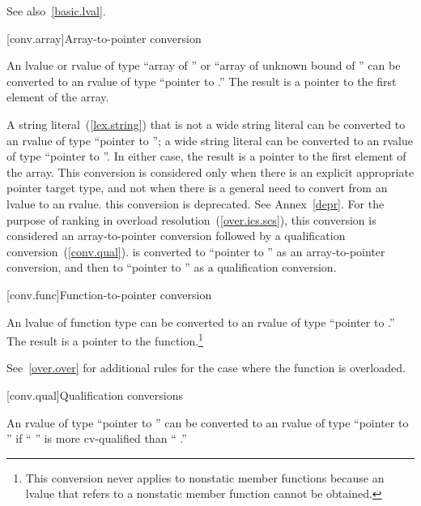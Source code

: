 \pnum
\enternote 
See also~\ref{basic.lval}.\exitnote 

[conv.array]{Array-to-pointer conversion}

\pnum
{}%
%
An lvalue or rvalue of type ``array of  '' or ``array
of unknown bound of '' can be converted to an rvalue of type
``pointer to .'' The result is a pointer to the first element
of the array.

\pnum
A string literal~(\ref{lex.string}) that is not a wide string literal
can be converted to an rvalue of type ``pointer to '';
a wide string literal can be converted to an rvalue of type ``pointer to
''. In either case, the result is a pointer to the first
element of the array. This conversion is considered only when there is
an explicit appropriate pointer target type, and not when there is a
general need to convert from an lvalue to an rvalue. \enternote this
conversion is deprecated. See Annex~\ref{depr}. \exitnote For the
purpose of ranking in overload resolution~(\ref{over.ics.scs}), this
conversion is considered an array-to-pointer conversion followed by
a qualification conversion~(\ref{conv.qual}). \enterexample {}
is converted to ``pointer to  '' as an
array-to-pointer conversion, and then to ``pointer to ''
as a qualification conversion. \exitexample

[conv.func]{Function-to-pointer conversion}

\pnum
{}%
An lvalue of function type  can be converted to an rvalue of
type ``pointer to .'' The result is a pointer to the
function.\footnote{This conversion never applies to nonstatic member functions because an
lvalue that refers to a nonstatic member function cannot be obtained.}

\pnum
\enternote 
See~\ref{over.over} for additional rules for the case where the function
is overloaded.
\exitnote 

[conv.qual]{Qualification conversions}

\pnum
{}%
An rvalue of type ``pointer to  '' can be
converted to an rvalue of type ``pointer to  '' if
`` '' is more cv-qualified than ``
.''

